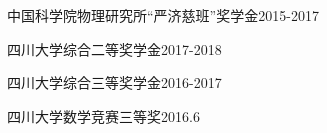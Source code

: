 \documentclass[12pt]{article}
\begin{document}
    \vspace{3mm}
    \begin{myCvItems}
            \item 中国科学院物理研究所“严济慈班”奖学金\hfill 2015-2017
            \item 四川大学综合二等奖学金\hfill 2017-2018  
            \item 四川大学综合三等奖学金\hfill 2016-2017
            \item 四川大学数学竞赛三等奖\hfill 2016.6 
    \end{myCvItems}


\end{document}
